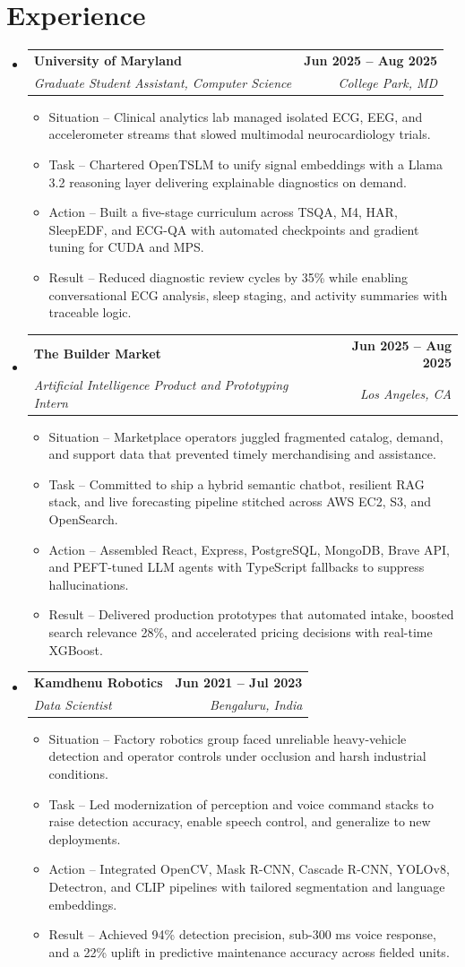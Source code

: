 \documentclass[letterpaper,9pt]{article}
\makeatletter
\newcommand{\resumeItem}[1]{\item \small{#1}}
\newcommand{\resumeSubheading}[4]{
  \item
    \begin{tabular*}{\textwidth}[t]{l@{\extracolsep{\fill}}r}
      \textbf{#1} & \textbf{\small #2} \\
      \textit{\small #3} & \textit{\small #4} \\
    \end{tabular*}\vspace{-4pt}
}
\newcommand{\resumeSubHeadingListStart}{\begin{itemize}[leftmargin=0.0in,label={},itemsep=4pt,topsep=2pt]}
\newcommand{\resumeSubHeadingListEnd}{\end{itemize}}
\newcommand{\resumeItemListStart}{\begin{itemize}[leftmargin=0.16in,labelsep=0.1in,itemsep=1.5pt,topsep=1.5pt]}
\newcommand{\resumeItemListEnd}{\end{itemize}\vspace{-4pt}}
\makeatother
\begin{document}
\section{Experience}
  \resumeSubHeadingListStart
    \resumeSubheading{University of Maryland}{Jun 2025 -- Aug 2025}{Graduate Student Assistant, Computer Science}{College Park, MD}
      \resumeItemListStart
        \resumeItem{Situation -- Clinical analytics lab managed isolated ECG, EEG, and accelerometer streams that slowed multimodal neurocardiology trials.}
        \resumeItem{Task -- Chartered OpenTSLM to unify signal embeddings with a Llama 3.2 reasoning layer delivering explainable diagnostics on demand.}
        \resumeItem{Action -- Built a five-stage curriculum across TSQA, M4, HAR, SleepEDF, and ECG-QA with automated checkpoints and gradient tuning for CUDA and MPS.}
        \resumeItem{Result -- Reduced diagnostic review cycles by 35\% while enabling conversational ECG analysis, sleep staging, and activity summaries with traceable logic.}
      \resumeItemListEnd
    \resumeSubheading{The Builder Market}{Jun 2025 -- Aug 2025}{Artificial Intelligence Product and Prototyping Intern}{Los Angeles, CA}
      \resumeItemListStart
        \resumeItem{Situation -- Marketplace operators juggled fragmented catalog, demand, and support data that prevented timely merchandising and assistance.}
        \resumeItem{Task -- Committed to ship a hybrid semantic chatbot, resilient RAG stack, and live forecasting pipeline stitched across AWS EC2, S3, and OpenSearch.}
        \resumeItem{Action -- Assembled React, Express, PostgreSQL, MongoDB, Brave API, and PEFT-tuned LLM agents with TypeScript fallbacks to suppress hallucinations.}
        \resumeItem{Result -- Delivered production prototypes that automated intake, boosted search relevance 28\%, and accelerated pricing decisions with real-time XGBoost.}
      \resumeItemListEnd
    \resumeSubheading{Kamdhenu Robotics}{Jun 2021 -- Jul 2023}{Data Scientist}{Bengaluru, India}
      \resumeItemListStart
        \resumeItem{Situation -- Factory robotics group faced unreliable heavy-vehicle detection and operator controls under occlusion and harsh industrial conditions.}
        \resumeItem{Task -- Led modernization of perception and voice command stacks to raise detection accuracy, enable speech control, and generalize to new deployments.}
        \resumeItem{Action -- Integrated OpenCV, Mask R-CNN, Cascade R-CNN, YOLOv8, Detectron, and CLIP pipelines with tailored segmentation and language embeddings.}
        \resumeItem{Result -- Achieved 94\% detection precision, sub-300 ms voice response, and a 22\% uplift in predictive maintenance accuracy across fielded units.}
      \resumeItemListEnd
  \resumeSubHeadingListEnd
\end{document}
